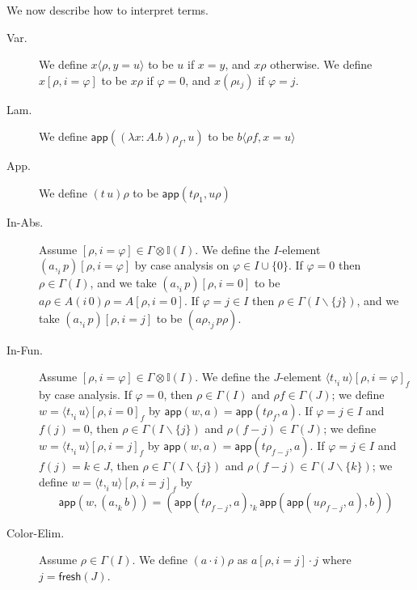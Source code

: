 \documentclass[english]{PaperTools/latex/lipics}
\newcommand\param[1]{\!\cdot\!#1}
\newcommand\fp[3]{⟨#2 ,_{#1} #3⟩}
\def\fresh#1{\mathsf{fresh}(#1)}
\def\app#1#2{\mathsf{app}(#1,#2)}
\begin{document}
\bigskip
We now describe how to interpret terms.
\begin{description}
  \item[\sc Var.]
    We define $x⟨ρ,y=u⟩$ to be $u$ if $x = y$, and $xρ$ otherwise.
    We define $x[ρ,i=φ]$ to be $xρ$ if $φ = 0$, and
    $x(ρι_j)$ if $φ = j$.

  \item[\sc Lam.]
    We define $\app{(λ x:A.b)ρ_f}{u}$ to be $b⟨ρf,x=u⟩$

  \item[\sc App.]
    We define $(t\,u)ρ$ to be $\app{tρ_1}{uρ}$

  \item[\sc In-Abs.]
    Assume $[ρ,i=φ] ∈ Γ⊗𝕀(I)$.  We define the $I$-element $(a ,_i p)[ρ,i=φ]$
    by case analysis on $φ ∈ I ∪ \{0\}$.
    If $φ = 0$ then $ρ ∈ Γ(I)$, and we take $(a ,_i p)[ρ,i=0]$ to be
    $aρ ∈ A(i\,0)ρ = A[ρ,i=0]$.
    If $φ = j ∈ I$ then $ρ ∈ Γ(I\backslash\{j\})$, and we take
    $(a ,_i p)[ρ,i=j]$ to be $(aρ ,_j pρ)$.

  \item[\sc In-Fun.]
    Assume $[ρ,i=φ] ∈ Γ⊗𝕀(I)$.  We define the $J$-element ${\fp i t u}[ρ,i=φ]_f$
    by case analysis.
    If $φ = 0$, then $ρ ∈ Γ(I)$ and $ρf ∈ Γ(J)$; we define
    $w = {\fp i t u}[ρ,i=0]_f$ by $\app{w}{a} = \app{tρ_f}{a}$.
    If $φ = j ∈ I$ and $f(j) = 0$, then $ρ ∈ Γ(I\backslash\{j\})$ and $ρ(f-j) ∈ Γ(J)$;
    we define $w = {\fp i t u}[ρ,i=j]_f$ by $\app{w}{a} = \app{tρ_{f-j}}{a}$.
    If $φ = j ∈ I$ and $f(j) = k ∈ J$, then $ρ ∈ Γ(I\backslash\{j\})$ and $ρ(f-j) ∈ Γ(J\backslash\{k\})$;
    we define $w = {\fp i t u}[ρ,i=j]_f$ by
    $$\app{w}{(a ,_k b)} = ( \app{tρ_{f-j}}{a} ,_k {\app{\app{uρ_{f-j}}{a}}{b}} )$$

  \item[\sc Color-Elim.]
    Assume $ρ ∈ Γ(I)$.  We define $(a \param i)ρ$ as
    $a[ρ,i=j]·j$ where $j = \fresh{J}$.
\end{description}
\end{document}
